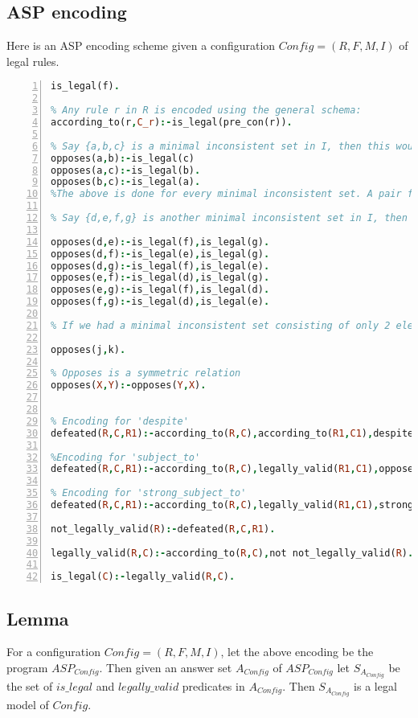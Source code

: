 \subsection{ASP encoding}
Here is an ASP encoding scheme given a configuration $Config = (R,F,M,I)$ of legal rules.
\begin{lstlisting}[language=Prolog, numbers=left]
% For any f in F, we have:
is_legal(f).    

% Any rule r in R is encoded using the general schema:
according_to(r,C_r):-is_legal(pre_con(r)).

% Say {a,b,c} is a minimal inconsistent set in I, then this would get encoded as: 
opposes(a,b):-is_legal(c)
opposes(a,c):-is_legal(b).
opposes(b,c):-is_legal(a).
%The above is done for every minimal inconsistent set. A pair from the set forms the opposes predicate and the rest of the elements go in the body 

% Say {d,e,f,g} is another minimal inconsistent set in I, then this would get encoded as:

opposes(d,e):-is_legal(f),is_legal(g).
opposes(d,f):-is_legal(e),is_legal(g).
opposes(d,g):-is_legal(f),is_legal(e).
opposes(e,f):-is_legal(d),is_legal(g).
opposes(e,g):-is_legal(f),is_legal(d).
opposes(f,g):-is_legal(d),is_legal(e).

% If we had a minimal inconsistent set consisting of only 2 elements say {j,k}, this would get encoded as:

opposes(j,k).

% Opposes is a symmetric relation
opposes(X,Y):-opposes(Y,X).


% Encoding for 'despite'
defeated(R,C,R1):-according_to(R,C),according_to(R1,C1),despite(R,R1).

%Encoding for 'subject_to'
defeated(R,C,R1):-according_to(R,C),legally_valid(R1,C1),opposes(C,C1),subject_to(R1,R).

% Encoding for 'strong_subject_to'
defeated(R,C,R1):-according_to(R,C),legally_valid(R1,C1),strong_subject_to(R1,R).

not_legally_valid(R):-defeated(R,C,R1).

legally_valid(R,C):-according_to(R,C),not not_legally_valid(R).

is_legal(C):-legally_valid(R,C).
\end{lstlisting}
\subsection{Lemma}
For a configuration $Config=(R,F,M,I)$, let the above encoding be the program $ASP_{Config}$. Then given an answer set $A_{Config}$ of $ASP_{Config}$ let $S_{A_{Config}}$ be the set of $is\_legal$ and $legally\_valid$ predicates in $A_{Config}$. Then $S_{A_{Config}}$ is a legal model of $Config$.    

